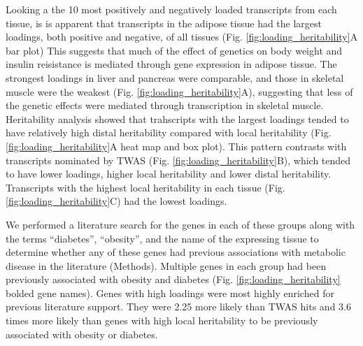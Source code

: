 \documentclass[
]{article}
\begin{document}
Looking a the 10 most positively and negatively loaded transcripts from
each tissue, is is apparent that transcripts in the adipose tissue had
the largest loadings, both positive and negative, of all tissues (Fig.
\ref{fig:loading_heritability}A bar plot) This suggests that much of the
effect of genetics on body weight and insulin reisistance is mediated
through gene expression in adipose tissue. The strongest loadings in
liver and pancreas were comparable, and those in skeletal muscle were
the weakest (Fig. \ref{fig:loading_heritability}A), suggesting that less
of the genetic effects were mediated through transcription in skeletal
muscle. Heritability analysis showed that trahscripts with the largest
loadings tended to have relatively high distal heritability compared
with local heritability (Fig. \ref{fig:loading_heritability}A heat map
and box plot). This pattern contrasts with transcripts nominated by TWAS
(Fig. \ref{fig:loading_heritability}B), which tended to have lower
loadings, higher local heritability and lower distal heritability.
Transcripts with the highest local heritability in each tissue (Fig.
\ref{fig:loading_heritability}C) had the lowest loadings.

We performed a literature search for the genes in each of these groups
along with the terms ``diabetes'', ``obesity'', and the name of the
expressing tissue to determine whether any of these genes had previous
associations with metabolic disease in the literature (Methods).
Multiple genes in each group had been previously associated with obesity
and diabetes (Fig. \ref{fig:loading_heritability} bolded gene names).
Genes with high loadings were most highly enriched for previous
literature support. They were 2.25 more likely than TWAS hits and 3.6
times more likely than genes with high local heritability to be
previously associated with obesity or diabetes.
\end{document}

